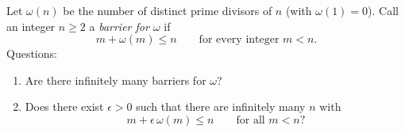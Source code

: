 Let $\omega(n)$ be the number of distinct prime divisors of $n$ (with $\omega(1)=0$).
Call an integer $n\ge2$ a \emph{barrier for $\omega$} if
\[
  m+\omega(m)\le n\qquad\text{for every integer }m<n.
\]
Questions:
\begin{enumerate}
  \item Are there infinitely many barriers for $\omega$?
  \item Does there exist $\epsilon>0$ such that there are infinitely many $n$ with
  $$m+\epsilon\,\omega(m)\le n\qquad\text{for all }m<n?$$
\end{enumerate}

